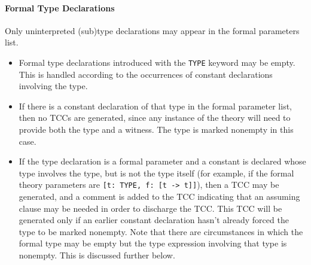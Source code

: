 \paragraph{Formal Type Declarations}

Only uninterpreted (sub)type declarations may appear in the formal
parameters list.

\begin{itemize}

\item Formal type declarations introduced with the \texttt{TYPE} keyword may
be empty.  This is handled according to the occurrences of constant
declarations involving the type.

\item If there is a constant declaration of that type in the formal
parameter list, then no TCCs are generated, since
any instance of the theory will need to provide both the type and a
witness.  The type is marked nonempty in this case.

\item If the type declaration is a formal parameter and a constant is
declared whose type involves the type, but is not the type itself (for
example, if the formal theory parameters are \texttt{[t:\ TYPE, f:\ [t ->
t]]}), then a TCC may be generated, and a comment is added to the TCC
indicating that an assuming clause may be needed in order to discharge the
TCC.  This TCC will be generated only if an earlier constant declaration
hasn't already forced the type to be marked nonempty.  Note that there are
circumstances in which the formal type may be empty but the type
expression involving that type is nonempty.  This is discussed further
below.

\end{itemize}

